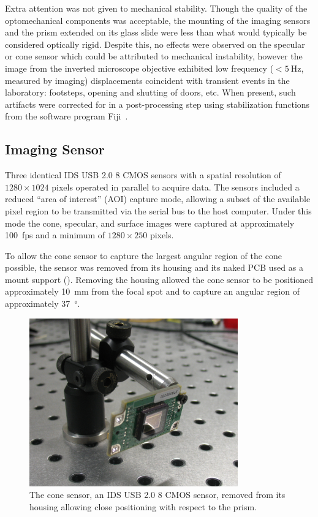 Extra attention was not given to mechanical stability.  Though the quality of
the optomechanical components was acceptable, the mounting of the imaging
sensors and the prism extended on its glass slide were less than what would
typically be considered optically rigid.  Despite this, no effects were
observed on the specular or cone sensor which could be attributed to
mechanical instability, however the image from the inverted microscope
objective exhibited low frequency ($<\SI{5}{\hertz}$, measured by imaging)
displacements coincident with transient events in the laboratory: footsteps,
opening and shutting of doors, etc.  When present, such artifacts were
corrected for in a post-processing step using stabilization functions from the
software program Fiji~\cite{schindelin2012fiji}.

\subsection{Imaging Sensor}

Three identical IDS USB 2.0 \SI{8}{\bit} CMOS sensors with a spatial
resolution of $1280\times1024$ pixels operated in parallel to acquire data.
The sensors included a reduced ``area of interest'' (AOI) capture mode,
allowing a subset of the available pixel region to be transmitted via the
serial bus to the host computer.  Under this mode the cone, specular, and
surface images were captured at approximately \SI{100}{fps} and a minimum of $1280\times250$ pixels.

To allow the cone sensor to capture the largest angular region of the cone
possible, the sensor was removed from its housing and its naked PCB used as
a mount support ().  Removing the housing allowed
the cone sensor to be positioned approximately \SI{10}{\milli\meter} from
the focal spot and to capture an angular region of approximately
\SI{37}{\degree}.
\begin{figure}[ht]
 \centering
 \includegraphics[width=9cm,keepaspectratio]{experimental/figures/nakedsensorcrop.jpg}
\caption{The cone sensor, an IDS USB 2.0 \SI{8}{\bit} CMOS sensor, removed from its housing allowing close positioning with respect to the prism.}
\label{fig:imagingsensor}
\end{figure}

